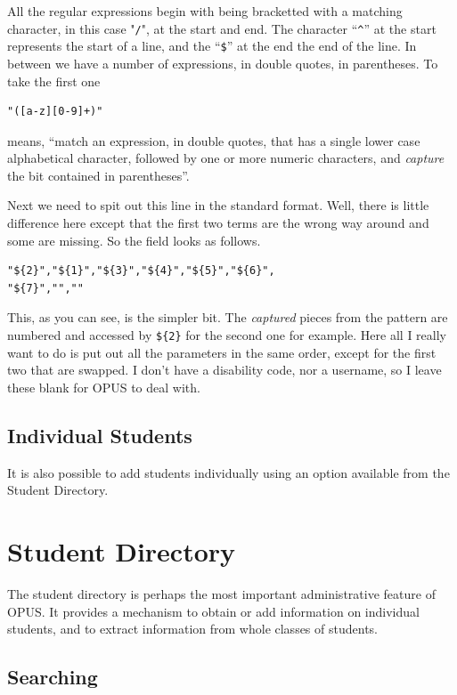 \documentclass[12 pt]{book}
\begin{document}
All the regular expressions begin with being bracketted with a matching
character, in this case
"\lstinline!/!", at the start and end. The character ``\lstinline!^!'' at the
start represents the
start of a line, and the ``\lstinline!$!'' at the end the end of the line. In
between we have a number of expressions, in double quotes, in parentheses. To
take the first one
\begin{lstlisting}
"([a-z][0-9]+)"
\end{lstlisting}
means, ``match an expression, in double quotes, that has a single lower case
alphabetical character, followed by one or more numeric characters, and
\emph{capture} the bit contained in parentheses''.

Next we need to spit out this line in the standard format. Well, there is
little difference here except that the first two terms are the wrong way
around and some are missing. So the  field looks as
follows.

\begin{lstlisting}
"${2}","${1}","${3}","${4}","${5}","${6}",
"${7}","",""
\end{lstlisting}

This, as you can see, is the simpler bit. The \emph{captured} pieces from the
pattern are numbered and accessed by \lstinline!${2}! for the second one for
example. Here all I really want to do is put out all the parameters in the
same order, except for the first two that are swapped. I don't have a disability
code, nor a username, so I leave these blank for OPUS to deal with.

\section{Individual Students}

It is also possible to add students individually using an option available from the Student
Directory.

\chapter{Student Directory}

The student directory is perhaps the most important administrative feature of OPUS. It provides
a mechanism to obtain or add information on individual students, and to extract information from
whole classes of students.

\section{Searching}
\end{document}
